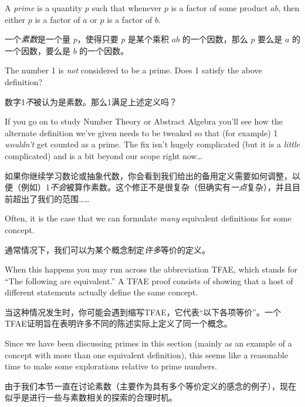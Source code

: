 \begin{defi}
A {\em prime} is a quantity $p$ such that whenever $p$ is a 
factor of some product $ab$, then either $p$ is a factor of
$a$ or $p$ is a factor of $b$.
\end{defi}

\begin{defi}
一个{\em 素数}是一个量 $p$，使得只要 $p$ 是某个乘积 $ab$ 的一个因数，那么 $p$ 要么是 $a$ 的一个因数，要么是 $b$ 的一个因数。
\end{defi}

\begin{exer}
The number 1 is {\em not} considered to be a prime.  Does
1 satisfy the above definition?
\end{exer}

\begin{exer}
数字1{\em 不}被认为是素数。那么1满足上述定义吗？
\end{exer}

If you go on to study Number Theory or Abstract Algebra you'll see how
the alternate definition we've given needs to be tweaked so that (for example) 
1 \emph{wouldn't} get counted as a prime.
The fix isn't hugely complicated (but it 
is a {\em little} complicated) and is a bit beyond our scope right now\ldots

如果你继续学习数论或抽象代数，你会看到我们给出的备用定义需要如何调整，以便（例如）1\emph{不会}被算作素数。这个修正不是很复杂（但确实有{\em 一点}复杂），并且目前超出了我们的范围……
 
Often, it is the case that we can formulate {\em many} equivalent
definitions for some concept.

通常情况下，我们可以为某个概念制定{\em 许多}等价的定义。

When this happens you may run
across the abbreviation TFAE, which stands for ``The following
are equivalent.''  A TFAE proof consists of showing that a host
of different statements actually define the same concept.

当这种情况发生时，你可能会遇到缩写TFAE，它代表“以下各项等价”。一个TFAE证明旨在表明许多不同的陈述实际上定义了同一个概念。

Since we have been discussing primes in this section (mainly 
as an example of a concept with more than one equivalent 
definition), this seems like a reasonable time to make some
explorations relative to prime numbers.

由于我们本节一直在讨论素数（主要作为具有多个等价定义的感念的例子），现在似乎是进行一些与素数相关的探索的合理时机。


